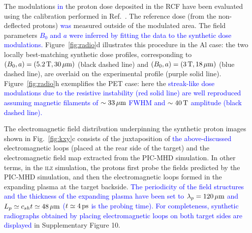 \documentclass[aps,showpacs,superscriptaddress]{revtex4}
\begin{document}
The modulations \textcolor{blue}{in} the proton dose deposited in the RCF have been evaluated using the calibration performed in Ref.~\cite{RSI_Chen_2016}. The reference dose (from the non-deflected protons) \textcolor{blue}{was} measured outside of the modulated area. The field parameters \textcolor{blue}{$B_0$ and $a$ were inferred by fitting the data to the synthetic dose modulations.} Figure~\ref{fig:radio}d illustrates this procedure in the Al case: the two locally best-matching synthetic dose profiles, corresponding to \textcolor{blue}{$(B_0,a)=(5.2\,\rm T, 30\,\rm \mu m)$} (black dashed line) and \textcolor{blue}{$(B_0,a)=(3\,\rm T,18\,\rm \mu m)$} (blue dashed line), are overlaid on the experimental profile (purple solid line). Figure~\ref{fig:radio}h exemplifies the PET case: here the \textcolor{blue}{streak-like dose modulations due to the resistive instability (red solid line) are well reproduced assuming magnetic filaments of $\sim 33\,\rm \mu m$ FWHM and $\sim 40\,\rm T$ amplitude (black dashed line).}

The electromagnetic field distribution underpinning the synthetic proton images shown in Fig.~\ref{fig:kxy}c consists of the juxtaposition of \textcolor{blue}{the above-discussed} electromagnetic loops (placed at the rear side of the target) and the electromagnetic field map extracted from the PIC-MHD simulation. In other terms, in the \textsc{ilz} simulation, the protons first probe the fields predicted by the PIC-MHD simulation, and then the electromagnetic loops formed in the expanding plasma at the target backside. \textcolor{blue}{The periodicity of the field structures and the thickness of the expanding plasma have been set to $\lambda_p=120\,\rm \mu m$ and $L_p \simeq c_{sh}t \simeq 48\,\rm \mu m$ ($t\simeq 4\,\rm ps$ is the probing time). For completeness, synthetic radiographs obtained by placing electromagnetic loops on both target sides are displayed} in Supplementary Figure 10. 
\end{document}
